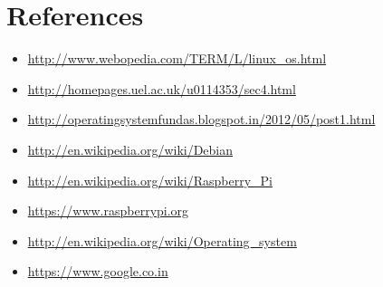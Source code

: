 \documentclass[11pt,a4paper]{article}
\begin{document}
	 \newpage
	\section{References}
	\begin{itemize}
		\item \url{http://www.webopedia.com/TERM/L/linux_os.html}
		\item \url{http://homepages.uel.ac.uk/u0114353/sec4.html}
		\item \url{http://operatingsystemfundas.blogspot.in/2012/05/post1.html}
		\item \url{http://en.wikipedia.org/wiki/Debian}
		\item \url{http://en.wikipedia.org/wiki/Raspberry_Pi}
		\item \url{https://www.raspberrypi.org}
		\item \url{http://en.wikipedia.org/wiki/Operating_system}
		\item \url{https://www.google.co.in}
	\end{itemize}
	
\end{document}
